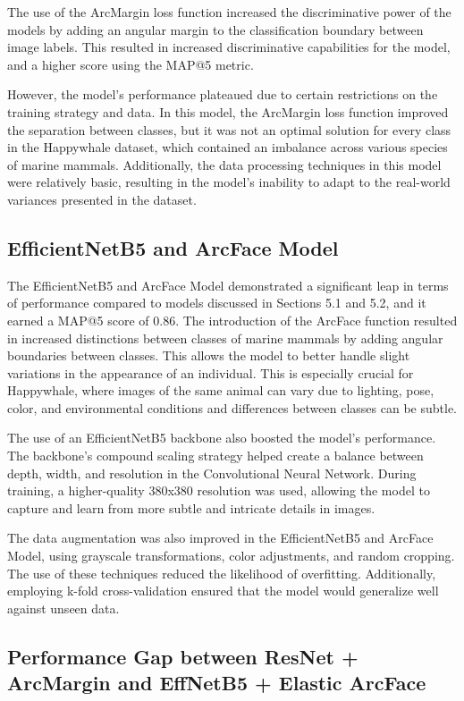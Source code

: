 \documentclass[twocolumn]{article}
\begin{document}
The use of the ArcMargin loss function increased the discriminative power of the models by adding an angular margin to the classification boundary between image labels. This resulted in increased discriminative capabilities for the model, and a higher score using the MAP@5 metric.

However, the model's performance plateaued due to certain restrictions on the training strategy and data. In this model, the ArcMargin loss function improved the separation between classes, but it was not an optimal solution for every class in the Happywhale dataset, which contained an imbalance across various species of marine mammals. Additionally, the data processing techniques in this model were relatively basic, resulting in the model's inability to adapt to the real-world variances presented in the dataset.

\subsection{EfficientNetB5 and ArcFace Model}

The EfficientNetB5 and ArcFace Model demonstrated a significant leap in terms of performance compared to models discussed in Sections 5.1 and 5.2, and it earned a MAP@5 score of 0.86. The introduction of the ArcFace function resulted in increased distinctions between classes of marine mammals by adding angular boundaries between classes. This allows the model to better handle slight variations in the appearance of an individual. This is especially crucial for Happywhale, where images of the same animal can vary due to lighting, pose, color, and environmental conditions and differences between classes can be subtle.

The use of an EfficientNetB5 backbone also boosted the model's performance. The backbone's compound scaling strategy helped create a balance between depth, width, and resolution in the Convolutional Neural Network. During training, a higher-quality 380x380 resolution was used, allowing the model to capture and learn from more subtle and intricate details in images.

The data augmentation was also improved in the EfficientNetB5 and ArcFace Model, using grayscale transformations, color adjustments, and random cropping. The use of these techniques reduced the likelihood of overfitting. Additionally, employing k-fold cross-validation ensured that the model would generalize well against unseen data. 

\subsection{Performance Gap between ResNet + ArcMargin and EffNetB5 + Elastic ArcFace}
\end{document}

